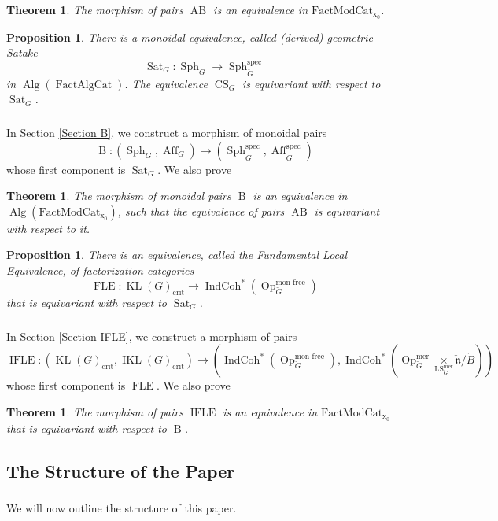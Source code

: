\documentclass[10pt]{amsart}
\newtheorem{prop}[subsubsection]{Proposition}
\newtheorem{thm}[subsubsection]{Theorem}
\theoremstyle{remark}
\newcommand{\on}[1]{\operatorname{#1}}
\newcommand{\IndCoh}{\on{IndCoh}}
\newcommand{\Gcheck}{\check{G}}
\newcommand{\ncheck}{\check{\mathfrak{n}}}
\newcommand{\Bcheck}{\check{B}}
\newcommand{\FactAlgCat}{\on{FactAlgCat}}
\newcommand{\FactModCat}{\on{FactModCat_{x_0}}}
\newcommand{\sssec}[1]{\subsubsection{}}
\begin{document}
\begin{thm} \label{Theorem AB}
    The morphism of pairs $\on{AB}$ is an equivalence in $\FactModCat$.
\end{thm}

\begin{prop} \cite{GLC2}
    There is a monoidal equivalence, called (derived) geometric Satake
    $$
    \on{Sat}_{G} : \on{Sph}_G \longrightarrow \on{Sph}_{\Gcheck}^{\on{spec}}
    $$
    in $\on{Alg}(\FactAlgCat)$. The equivalence $\on{CS}_G$ is equivariant with respect to $\on{Sat}_G$.
\end{prop}

\sssec{}
In Section \ref{Section B}, we construct a morphism of monoidal pairs
$$
\on{B} : (\on{Sph}_G, \on{Aff}_G) \longrightarrow (\on{Sph}_{\Gcheck}^{\on{spec}}, \on{Aff}_{\Gcheck}^{\on{spec}})
$$
whose first component is $\on{Sat}_G$. We also prove

\begin{thm} \label{Theorem B}
    The morphism of monoidal pairs $\on{B}$ is an equivalence in $\on{Alg}(\FactModCat)$, such that the equivalence of pairs $\on{AB}$ is equivariant with respect to it.
\end{thm}

\begin{prop} \cite{GLC2}
    There is an equivalence, called the Fundamental Local Equivalence, of factorization categories
    $$
    \on{FLE}: \on{KL}(G)_{\on{crit}} \longrightarrow \IndCoh^*(\on{Op}_{\Gcheck}^{\on{mon-free}})
    $$
    that is equivariant with respect to $\on{Sat}_G$.
\end{prop}

\sssec{}
In Section \ref{Section IFLE}, we construct a morphism of pairs
$$
\on{IFLE} : (\on{KL}(G)_{\on{crit}}, \on{IKL}(G)_{\on{crit}}) \longrightarrow (\IndCoh^*(\on{Op}_{\Gcheck}^{\on{mon-free}}), \IndCoh^*(\on{Op}_{\Gcheck}^{\on{mer}} \underset{\on{LS}_{\Gcheck}^{\on{mer}}}{\times} \ncheck/\Bcheck))
$$
whose first component is $\on{FLE}$. We also prove
\begin{thm} \label{Theorem IFLE}
    The morphism of pairs $\on{IFLE}$ is an equivalence in $\FactModCat$ that is equivariant with respect to $\on{B}$.
\end{thm}

\subsection{The Structure of the Paper}
\sssec{}
We will now outline the structure of this paper.
\end{document}
